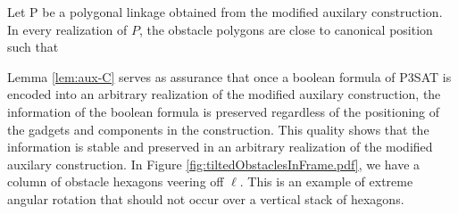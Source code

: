 \begin{lem}\label{lem:aux-C}
Let P be a polygonal linkage obtained from the modified auxilary construction.  
In every realization of $P$, the obstacle polygons are close to canonical position such that 
\end{lem}
Lemma \ref{lem:aux-C} serves as assurance that once a boolean formula of P3SAT is encoded into an arbitrary realization of the modified auxilary construction, the information of the boolean formula is preserved regardless of the positioning of the gadgets and components in the construction.
This quality shows that the information is stable and preserved in an arbitrary realization of the modified auxilary construction.
In Figure \ref{fig:tiltedObstaclesInFrame.pdf}, we have a column of obstacle hexagons veering off $\ell$.
This is an example of extreme angular rotation that should not occur over a vertical stack of hexagons.


